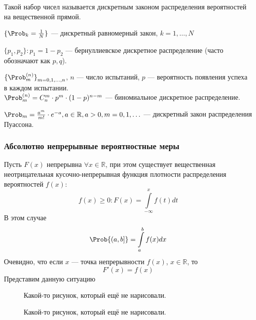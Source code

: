 Такой набор чисел называется дискретным законом распределения вероятностей на вещественной прямой.
\begin{example}
	$\{ \Prob_k = \frac{1}{N} \}$ --- дискретный равномерный закон, $k = 1, \ldots, N$
\end{example}
\begin{example}
	$\{ p_1, p_2 \} : p_1 = 1 - p_2$ --- бернуллиевское дискретное распределение (часто обозначают как $p, q$).
\end{example}
\begin{example}
	${ \{ {\Prob}_{m}^{ (n) } \} }_{m = 0, 1, \ldots, n}$, $n$ --- число испытаний, $p$ --- вероятность появления успеха в каждом испытании. \\
	$\Prob_m^{(n)} = C_n^m \cdot p^m \cdot (1 - p)^{n-m}$ --- биномиальное дискретное распределение.
\end{example}
\begin{example}
	$\Prob_m = \frac{a^m}{m!} \cdot e^{-a}, a \in \mathbb{R}, a > 0, m = 0, 1, \ldots$ --- дискретный закон распределения Пуассона.
\end{example}
\subsubsection{Абсолютно непрерывные вероятностные меры}
Пусть $F(x)$ непрерывна $\forall x \in \mathbb{R}$, при этом существует вещественная неотрицательная кусочно-непрерывная функция плотности распределения вероятностей $f(x)$:
\[
	f(x) \geqslant 0 : F(x) = \int\limits_{-\infty}^x f(t) dt
\]
В этом случае
\[
	\Prob \{ (a, b] \} = \int\limits_a^b f(x) dx
\]
Очевидно, что если $x$ --- точка непрерывности $f(x)$, $x \in \mathbb{R}$, то
\[
	F'(x) = f(x)
\]
Представим данную ситуацию
\begin{figure}[ht] %
	\centering
	\def\svgwidth{16em}
	
	\caption{Какой-то рисунок, который ещё не нарисовали.}
\end{figure}
\begin{figure}[ht] %
	\centering
	\def\svgwidth{16em}
	
	\caption{Какой-то рисунок, который ещё не нарисовали.}
\end{figure}

